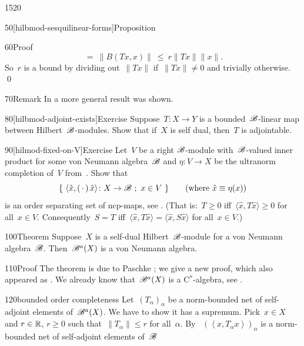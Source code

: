 \begin{parsec}{1520}
\begin{point}{50}[hilbmod-sesquilinear-forms]{Proposition}
\begin{point}{60}{Proof}
\begin{equation*}
            \ =\  \| B (Tx, x) \|
            \ \leq\  r \|Tx\|\|x\|.
\end{equation*}
So~$r$ is a bound
    by dividing out~$\| T x \|$
    if~$\| Tx \| \neq 0$
    and trivially otherwise.  \qed
\end{point}
\begin{point}{70}{Remark}%
In  a more general result was shown.
\end{point}
\end{point}
\begin{point}{80}[hilbmod-adjoint-exists]{Exercise}%
Suppose~$T\colon X \to Y$ is a bounded~$\mathscr{B}$-linear map between
    Hilbert~$\mathscr{B}$-modules.
Show that if~$X$ is self dual,
    then~$T$ is adjointable. \cite[prop.~3.4]{paschke}
\end{point}
\begin{point}{90}[hilmod-fixed-on-V]{Exercise}%
Let~$V$ be a right $\mathscr{B}$-module with~$\mathscr{B}$-valued inner product
        for some von Neumann algebra~$\mathscr{B}$ and
    $\eta\colon V \to X$ be the ultranorm completion of~$V$
    from~.
Show that
\begin{equation*}
    \{\ \langle \hat{x}, (\,\cdot\,)\, \hat{x}\rangle \colon X \to \mathscr{B} \ ;\ x \in V\  \} \qquad \text{(where $\hat{x} \equiv \eta(x)$)}
\end{equation*}
is an order separating set of ncp-maps, see .
    (That is:~$T \geq 0$ iff~$\langle \hat{x}, T \hat{x}\rangle \geq 0$
    for all~$x \in V$.
    Consequently~$S = T$ iff~$\langle \hat{x}, T \hat{x} \rangle 
    = \langle \hat{x}, S \hat{x} \rangle$ for all~$x \in V$.)
\end{point}
\begin{point}{100}{Theorem}%
Suppose~$X$ is a self-dual Hilbert~$\mathscr{B}$-module
    for a von Neumann algebra~$\mathscr{B}$.
Then~$\mathscr{B}^a(X)$ is a von Neumann algebra.
\begin{point}{110}{Proof}%
The theorem is due to Paschke \cite[prop.~3.10]{paschke};
    we give a new proof, which also appeared as .
We already know that~$\mathscr{B}^a(X)$ is a C$^*$-algebra, see .
\begin{point}{120}{bounded order completeness}%
Let~$(T_\alpha)_\alpha$ be a norm-bounded net of self-adjoint elements
    of~$\mathscr{B}^a(X)$.  We have to show it has a supremum.
Pick~$x\in X$ and  $r\in \mathbb{R}$, $r\geq0 $
such that~$\|T_\alpha\| \leq r$ for all~$\alpha$.
By ~$(\left<x,T_\alpha x\right>)_\alpha$
    is a norm-bounded net of self-adjoint elements of~$\mathscr{B}$

\end{point}
\end{point}
\end{point}
\end{parsec}
